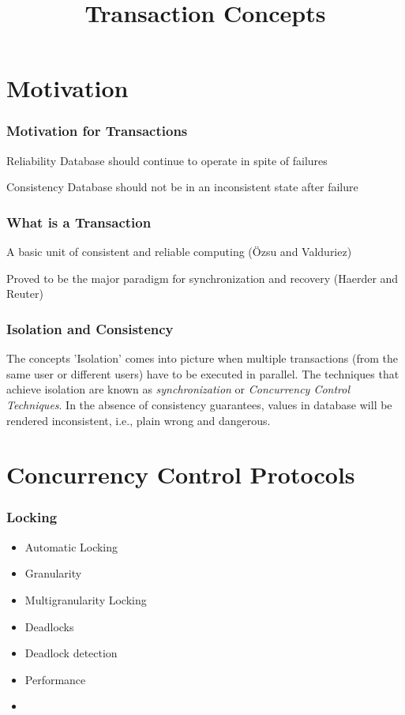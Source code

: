 \documentclass[12]{beamer}
\title{Transaction Concepts}
\date
\begin{document}
\maketitle

\section{Motivation}

\begin{frame}
\frametitle{Motivation for Transactions}
\begin{block}{Reliability}
Database should continue to operate in spite of failures
\end{block}
\begin{block}{Consistency}
Database should not be in an inconsistent state after failure \end{block}
\end{frame}

%
%
\begin{frame}
  \frametitle{What is a Transaction}
  \begin{definition}
    A basic unit of consistent and reliable computing (\"Ozsu and Valduriez) 
  \end{definition}
\vspace{5mm}
Proved to be the major paradigm for synchronization and recovery (Haerder and Reuter)
\end{frame}



\begin{frame}
\frametitle{Isolation and Consistency}
The concepts 'Isolation' comes into picture when multiple transactions (from the same user or different users) have to be executed in parallel.
\vspace{5mm}
The techniques that achieve isolation are known as \textit{synchronization} or \textit{Concurrency Control Techniques}. In the absence of consistency guarantees, values in database will be rendered inconsistent, i.e., plain wrong and dangerous.
\end{frame}

\section{Concurrency Control Protocols}

\begin{frame}
  \frametitle{Locking}
  \begin{itemize}
	\item Automatic Locking
	\item Granularity
	\item Multigranularity Locking
	\item Deadlocks
	\item Deadlock detection
	\item Performance
	\item 
  \end{itemize}
\end{frame}
\end{document}
